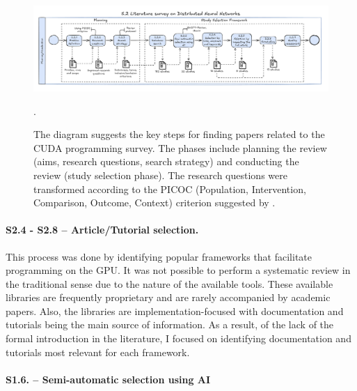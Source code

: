 \begin{figure}[th]
	\centering
	\includegraphics[width=\linewidth]{figures/survey-dnn.pdf}
	\caption{The diagram suggests the key steps for finding papers related to the CUDA programming survey. The phases
		include planning the review (aims, research questions, search strategy) and conducting the review (study selection phase). The research questions
		were transformed according to the PICOC (Population, Intervention, Comparison, Outcome, Context) criterion suggested by \cite{keele_systematic_2007}.}.
	\label{fig:workflow-study-cuda}
\end{figure}

\paragraph{S2.4 - S2.8 -- Article/Tutorial selection.}
This process was done by identifying popular frameworks that facilitate programming on the GPU. It
was not possible to perform a systematic review in the traditional sense due to the nature of the
available tools. These available libraries are frequently proprietary and are rarely accompanied by
academic papers. Also, the libraries are implementation-focused with documentation and tutorials
being the main source of information. As a result, of the lack of the formal introduction in the
literature, I focused on identifying documentation and tutorials most relevant for each framework.

\paragraph{S1.6. -- Semi-automatic selection using AI}
\label{sec:ai-screening}

